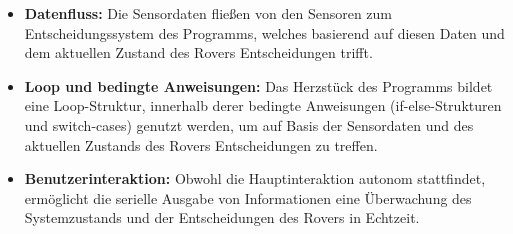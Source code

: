 \documentclass{vorlage-design-main}
\begin{document}
\begin{itemize}

\item
  \textbf{Datenfluss:} Die Sensordaten fließen von den Sensoren zum
  Entscheidungssystem des Programms, welches basierend auf diesen Daten
  und dem aktuellen Zustand des Rovers Entscheidungen trifft.
\item
  \textbf{Loop und bedingte Anweisungen:} Das Herzstück des Programms
  bildet eine Loop-Struktur, innerhalb derer bedingte Anweisungen
  (if-else-Strukturen und switch-cases) genutzt werden, um auf Basis der
  Sensordaten und des aktuellen Zustands des Rovers Entscheidungen zu
  treffen.
\item
  \textbf{Benutzerinteraktion:} Obwohl die Hauptinteraktion autonom
  stattfindet, ermöglicht die serielle Ausgabe von Informationen eine
  Überwachung des Systemzustands und der Entscheidungen des Rovers in
  Echtzeit.
\end{itemize}

\newpage
\end{document}

